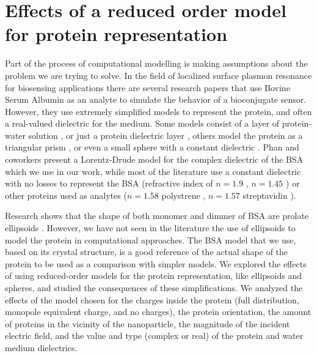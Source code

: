 \chapter{Effects of a reduced order model for protein representation}
\graphicspath{{rom_studies/figs/}}

Part of the process of computational modelling is making assumptions about the problem we are trying to solve. In the 
field of localized surface plasmon resonance for biosensing applications there are several research papers that use Bovine Serum Albumin 
as an analyte to simulate the behavior of a bioconjugate sensor. However, they use extremely simplified models
to represent the protein, and often a real-valued dielectric for the medium. Some models consist of  
a layer of protein-water solution \cite{PhanETal2013}, 
or just a protein dielectric layer \cite{NghiemETal2012}, others model the
protein as a triangular prism \cite{DanHu2014}, or even a small sphere with a 
constant dielectric \cite{AntosiewiczApellClaudioKall2011, DavisGomezVernon2010,SantiagoCordobaETal2011, UngerETal2009}. Phan and 
coworkers \cite{PhanETal2013} present a Lorentz-Drude model for the complex 
dielectric of the BSA which we use in our work, while most of the literature 
use a constant dielectric with no losses to represent the BSA 
(refractive index of $n= 1.9$ \cite{NghiemETal2012}, $n= 1.45$ \cite{SantiagoCordobaETal2011}) or
other proteins used as analytes ($n=1.58$ polystrene \cite{UngerETal2009}, $n=1.57$ 
streptavidin \cite{ShenETal2013}). 

Research shows that the shape of both monomer and dimmer of BSA are prolate ellipsoids 
\cite{MoserETal1966, SquireETal1968, WrightETal1975}. However, we have not seen in the literature the use of ellipsoids 
to model the protein in computational approaches. The BSA model that we use, based on its crystal 
structure, is a good reference of the actual shape of the protein to be used as a comparison with simpler models. We 
explored the effects of using reduced-order models for the protein representation, like ellipsoids and spheres, and
studied the consequences of these simplifications. We analyzed the effects of the model chosen 
for the charges inside the protein (full distribution, monopole equivalent charge, and no charges), the protein orientation, the 
amount of proteins in the vicinity of the nanoparticle, the magnitude of the incident electric field, and the value and type (complex or real)
of the protein and water medium dielectrics. 

